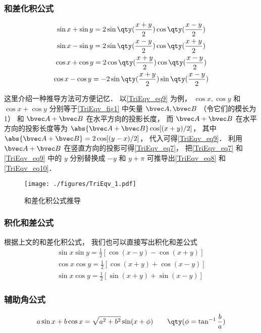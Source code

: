 \subsubsection{和差化积公式}
\begin{gather}
\sin x + \sin y = 2\sin\qty(\frac{x + y}{2})\cos\qty(\frac{x - y}{2})\label{TriEqv_eq7}\\
\sin x - \sin y = 2\sin\qty(\frac{x - y}{2})\cos\qty(\frac{x + y}{2})\label{TriEqv_eq8}\\
\cos x + \cos y = 2\cos\qty(\frac{x+y}{2})\cos\qty(\frac{x-y}{2})\label{TriEqv_eq9}\\
\cos x - \cos y = -2\sin\qty(\frac{x+y}{2})\sin\qty(\frac{x-y}{2})\label{TriEqv_eq10}
\end{gather}

这里介绍一种推导方法可方便记忆． 以\autoref{TriEqv_eq9} 为例， $\cos x, \cos y$ 和 $\cos x + \cos y$ 分别等于\autoref{TriEqv_fig1} 中矢量 $\bvec A, \bvec B$ （令它们的模长为 1） 和 $\bvec A + \bvec B$ 在水平方向的投影长度， 而 $\bvec A + \bvec B$ 在水平方向的投影长度等为 $\abs{\bvec A + \bvec B}\cos[(x+y)/2]$， 其中 $\abs{\bvec A + \bvec B} = 2\cos [(y-x)/2]$， 代入可得\autoref{TriEqv_eq9}． 利用 $\bvec A + \bvec B$ 在竖直方向的投影可得\autoref{TriEqv_eq7}， 把\autoref{TriEqv_eq7} 和\autoref{TriEqv_eq9} 中的 $y$ 分别替换成 $-y$ 和 $y+\pi$ 可推导出\autoref{TriEqv_eq8} 和\autoref{TriEqv_eq10}．
\begin{figure}[ht]
\centering
\texttt{[image: ./figures/TriEqv\_1.pdf]}
\caption{和差化积公式推导} \label{TriEqv_fig1}
\end{figure}

\subsubsection{积化和差公式}
根据上文的和差化积公式， 我们也可以直接写出积化和差公式
\begin{gather}
\label{TriEqv_eq11}
\sin x\sin y = \frac12 [\cos(x - y) - \cos(x + y)]\\
\label{TriEqv_eq12}
\cos x\cos y = \frac12 [\cos(x + y) + \cos(x - y)]\\
\label{TriEqv_eq14}
\sin x\cos y = \frac12 [\sin(x + y) + \sin(x - y)]
\end{gather}

\subsubsection{辅助角公式}
\begin{equation}
a\sin x + b\cos x = \sqrt{a^2+b^2}\sin(x + \phi) \qquad \qty(\phi = \tan^{-1}\frac{b}{a})
\end{equation}
